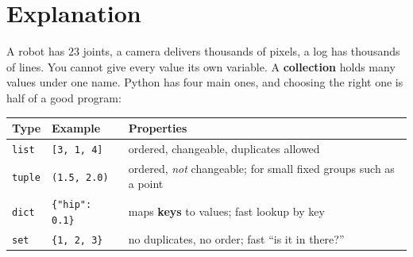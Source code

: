 \label{ch:py4}

\section*{Explanation}
A robot has $23$ joints, a camera delivers thousands of pixels, a log has thousands of lines. You cannot give every value its own variable. A \textbf{collection} holds many values under one name. Python has four main ones, and choosing the right one is half of a good program:
\begin{center}
\renewcommand{\arraystretch}{1.25}
\begin{tabular}{p{2.2cm}p{3.2cm}p{7.6cm}}
\textbf{Type} & \textbf{Example} & \textbf{Properties}\\ \hline
\texttt{list} & \texttt{[3, 1, 4]} & ordered, changeable, duplicates allowed\\
\texttt{tuple} & \texttt{(1.5, 2.0)} & ordered, \emph{not} changeable; for small fixed groups such as a point\\
\texttt{dict} & \texttt{\{"hip": 0.1\}} & maps \textbf{keys} to values; fast lookup by key\\
\texttt{set} & \texttt{\{1, 2, 3\}} & no duplicates, no order; fast ``is it in there?''\\
\end{tabular}
\end{center}

